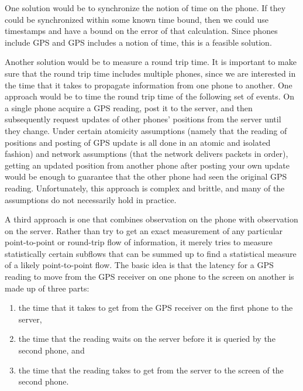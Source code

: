 \documentclass{acm_proc_article-sp}
\begin{document}
One solution would be to synchronize the notion of time on the phone.
If they could be synchronized within some known time bound, then we
could use timestamps and have a bound on the error of that
calculation.  Since phones include GPS and GPS includes a notion of
time, this is a feasible solution.

Another solution would be to measure a round trip time.  It is
important to make sure that the round trip time includes multiple
phones, since we are interested in the time that it takes to propagate
information from one phone to another.  One approach would be to time
the round trip time of the following set of events.  On a single phone
acquire a GPS reading, post it to the server, and then subsequently
request updates of other phones' positions from the server until they
change.  Under certain atomicity assumptions (namely that the reading
of positions and posting of GPS update is all done in an atomic and
isolated fashion) and network assumptions (that the network delivers
packets in order), getting an updated position from another phone
after posting your own update would be enough to guarantee that the
other phone had seen the original GPS reading.  Unfortunately, this
approach is complex and brittle, and many of the assumptions do not
necessarily hold in practice.

A third approach is one that combines observation on the phone with
observation on the server.  Rather than try to get an exact
measurement of any particular point-to-point or round-trip flow of
information, it merely tries to measure statistically certain subflows
that can be summed up to find a statistical measure of a likely
point-to-point flow.  The basic idea is that the latency for a GPS
reading to move from the GPS receiver on one phone to the screen on
another is made up of three parts:

\begin{enumerate}
\item the time that it takes to get from the GPS receiver on the first phone to the server,
\item the time that the reading waits on the server before it is queried by the second phone, and
\item the time that the reading takes to get from the server to the screen of the second phone.
\end{enumerate}
\end{document}
